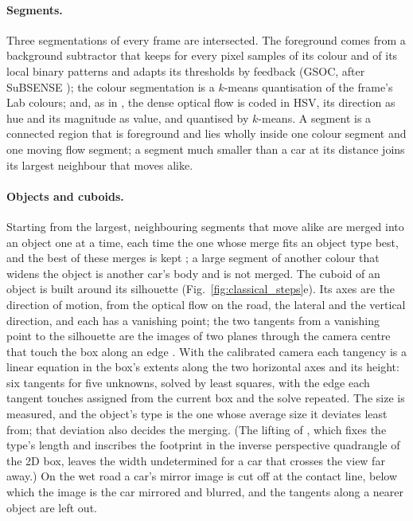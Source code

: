 \documentclass[runningheads,a4paper]{llncs}
\begin{document}
\paragraph{Segments.} Three segmentations of every frame are intersected. The foreground comes from a background
subtractor that keeps for every pixel samples of its colour and of its local binary patterns and adapts its
thresholds by feedback (GSOC, after SuBSENSE \cite{subsense}); the colour segmentation is a $k$-means quantisation of
the frame's Lab colours; and, as in \cite{moving_orig}, the dense optical flow \cite{farneback} is coded in HSV, its
direction as hue and its magnitude as value, and quantised by $k$-means. A segment is a connected region that is
foreground and lies wholly inside one colour segment and one moving flow segment; a segment much smaller than a car
at its distance joins its largest neighbour that moves alike.

\paragraph{Objects and cuboids.} Starting from the largest, neighbouring segments that move alike are merged into an
object one at a time, each time the one whose merge fits an object type best, and the best of these merges is kept
\cite{moving_orig}; a large segment of another colour that widens the object is another car's body and is not merged.
The cuboid of an object is built around its silhouette (Fig.~\ref{fig:classical_steps}e). Its axes are the direction
of motion, from the optical flow on the road, the lateral and the vertical direction, and each has a vanishing point;
the two tangents from a vanishing point to the silhouette are the images of two planes through the camera centre that
touch the box along an edge \cite{dubska2014}. With the calibrated camera each tangency is a linear equation in the
box's extents along the two horizontal axes and its height: six tangents for five unknowns, solved by least squares,
with the edge each tangent touches assigned from the current box and the solve repeated. The size is measured, and
the object's type is the one whose average size it deviates least from; that deviation also decides the merging. (The
lifting of \cite{moving_orig}, which fixes the type's length and inscribes the footprint in the inverse perspective
quadrangle of the 2D box, leaves the width undetermined for a car that crosses the view far away.) On the wet road a
car's mirror image is cut off at the contact line, below which the image is the car mirrored and blurred, and the
tangents along a nearer object are left out.
\end{document}
